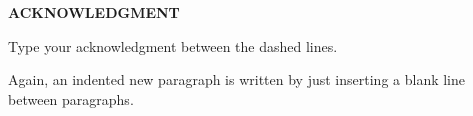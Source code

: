 \cleardoublepage{}
\begin{center}
{\bf ACKNOWLEDGMENT}\\[36pt]
\end{center}

{\baselineskip
Type your acknowledgment between the dashed lines.

Again, an indented new paragraph is written by just inserting a blank line between paragraphs.

}%